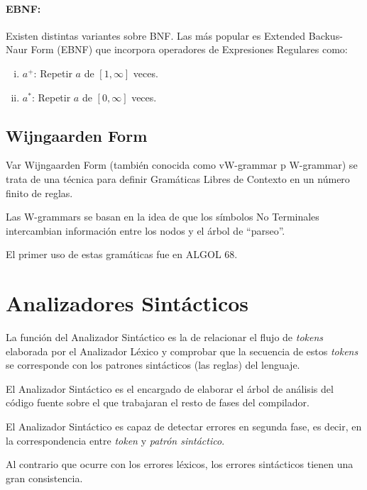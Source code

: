 \paragraph*{EBNF:} Existen distintas variantes sobre BNF. Las más popular es Extended Backus-Naur Form (EBNF) que incorpora operadores de Expresiones Regulares como:

\begin{enumerate}[i.]

\item $a^+$: Repetir $a$ de $[1,\infty]$ veces.

\item $a^*$: Repetir $a$ de $[0,\infty]$ veces.

\end{enumerate}


\subsection{Wijngaarden Form}

Var Wijngaarden Form (también conocida como vW-grammar p W-grammar) se trata de una técnica para definir Gramáticas Libres de Contexto en un número finito de reglas.

Las W-grammars se basan en la idea de que los símbolos No Terminales intercambian información entre los nodos y el árbol de ``parseo''.

El primer uso de estas gramáticas fue en ALGOL 68.

\section{Analizadores Sintácticos}

 La función del Analizador Sintáctico es la de relacionar el flujo de \textit{tokens} elaborada por el Analizador Léxico y comprobar que la secuencia de estos \textit{tokens} se corresponde con los patrones sintácticos (las reglas) del lenguaje.

{\cor El Analizador Sintáctico es el encargado de elaborar el árbol de análisis del código fuente sobre el que trabajaran el resto de fases del compilador.}

 El Analizador Sintáctico es capaz de detectar errores en segunda fase, es decir, en la correspondencia entre \textit{token} y \textit{patrón sintáctico}.

{\cor Al contrario que ocurre con los errores léxicos, los errores sintácticos tienen una gran consistencia.}

